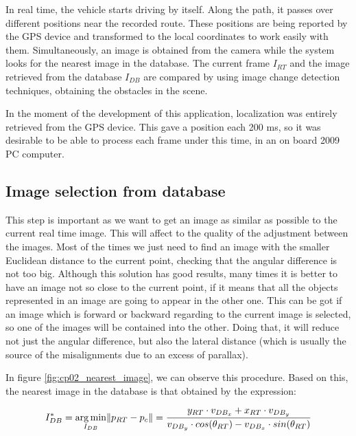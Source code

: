 In real time, the vehicle starts driving by itself. Along the path, it passes over different positions near the recorded route. These positions are being reported by the GPS device and transformed to the local coordinates to work easily with them. Simultaneously, an image is obtained from the camera while the system looks for the nearest image in the database. The current frame $I_{RT}$ and the image retrieved from the database $I_{DB}$ are compared by using image change detection techniques, obtaining the obstacles in the scene.

In the moment of the development of this application, localization was entirely retrieved from the GPS device. This gave a position each 200 ms, so it was desirable to be able to process each frame under this time, in an on board 2009 PC computer.

\subsection{Image selection from database}\label{ch:chapter02_01_01}

This step is important as we want to get an image as similar as possible to the current real time image. This will affect to the quality of the adjustment between the images. Most of the times we just need to find an image with the smaller Euclidean distance to the current point, checking that the angular difference is not too big. Although this solution has good results, many times it is better to have an image not so close to the current point, if it means that all the objects represented in an image are going to appear in the other one. This can be got if an image which is forward or backward regarding to the current image is selected, so one of the images will be contained into the other. Doing that, it will reduce not just the angular difference, but also the lateral distance (which is usually the source of the misalignments due to an excess of parallax).

In figure \ref{fig:cp02_nearest_image}, we can observe this procedure. Based on this, the nearest image in the database is that obtained by the expression:

\begin{equation}\label{eq:cp02_nearest_image}
I^*_{DB} = \underset{I_{DB}}{\arg\min} \|p_{RT} - p_c\| = {{y_{RT} \cdot v_{DB_x} + x_{RT} \cdot v_{DB_y}} \over 
  {v_{DB_y} \cdot cos(\theta_{RT}) - v_{DB_x} \cdot sin(\theta_{RT})}}
\end{equation}

